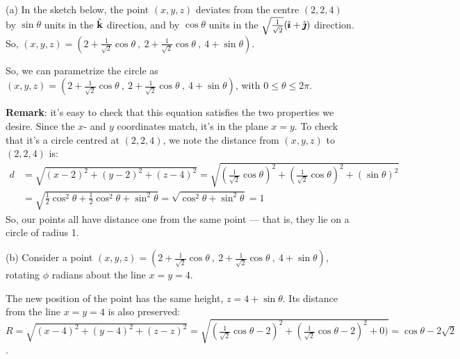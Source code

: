 \begin{solution}
(a) In the sketch below, the point $(x,y,z)$ deviates from the centre $(2,2,4)$ by $\sin\theta$ units in the $\hat{\mathbf{k}}$ direction, and by $\cos\theta$ units in the $\sqrt \frac1{\sqrt 2}(\hat{\pmb{\imath}}+\hat{\pmb{\jmath}})$ direction. So, $(x,y,z)=(2+\frac1{\sqrt 2}\cos\theta~,~2+\frac1{\sqrt 2}\cos\theta~,~4+\sin\theta)$.

\begin{center}
\end{center}
So, we can parametrize the circle as $(x,y,z)=(2+\frac1{\sqrt 2}\cos\theta~,~2+\frac1{\sqrt 2}\cos\theta~,~4+\sin\theta)$, with $0 \le \theta \le 2\pi$.

\textbf{Remark}: it's easy to check that this equation satisfies the two properties we desire. Since the $x$- and $y$ coordinates match, it's in the plane $x=y$. To check that it's a circle centred at $(2,2,4)$, we note the distance from $(x,y,z)$ to $(2,2,4)$ is:
\begin{align*}
d&=\sqrt{(x-2)^2+(y-2)^2+(z-4)^2}=\sqrt{\left(\frac1{\sqrt 2}\cos\theta\right)^2+\left(\frac1{\sqrt 2}\cos\theta\right)^2+\left(\sin\theta\right)^2}\\
&=\sqrt{\frac12\cos^2\theta+\frac12\cos^2\theta+\sin^2\theta}=\sqrt{\cos^2\theta+\sin^2\theta}=1
\end{align*}
So, our points all have distance one from the same point --- that is, they lie on a circle of radius 1.

(b) Consider a point $(x,y,z)=(2+\frac1{\sqrt 2}\cos\theta~,~2+\frac1{\sqrt 2}\cos\theta~,~4+\sin\theta)$, rotating $\phi$ radians about the line $x=y=4$.
\begin{center}
\end{center}
The new position of the point has the same height, $z=4+\sin\theta$. Its distance from the line $x=y=4$ is also preserved: $R=\sqrt{(x-4)^2+(y-4)^2+(z-z)^2}=\sqrt{(\frac1{\sqrt 2}\cos\theta-2)^2+(\frac1{\sqrt 2}\cos\theta-2)^2+0)}=\cos\theta-2\sqrt2$.


\end{solution}
